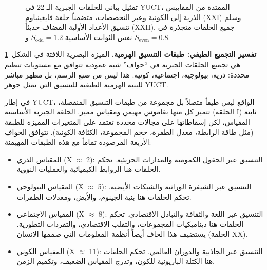 \documentclass[12pt,a4paper]{article}
\begin{document}
\begin{otherlanguage}{english}
\begin{figure}[htbp]
			\caption{تمثيل بياني للحلقات الجبرية الـ 22 في YUCT، الممتدة من المقاييس الذرية إلى الكونية وعبر التخصصات، متضمناً حلقة فايغينباوم (XXI) وسلم تنسيق الأعداد الأولية المضاف حديثاً (XXII). جميع الحلقات متجذرة في نفس الثوابت الأساسية $S_{\mathrm{odd}} = 1.2$ و $S_{\mathrm{even}} = 0.8$.}
			\label{fig:twentyone-loops}
		\end{figure}
	\end{otherlanguage}
	
	\vspace{0.5cm}
	\noindent
	\textbf{تفسير التجميع الطيفي: طبقات التنسيق الهرمية.}
	الميزة البصرية اللافتة في الشكل~\ref{fig:twentyone-loops} هي تجميع الحلقات الجبرية في ``حواف'' شبه عمودية تتوافق مع مستويات تنظيم محددة: ذرية، بيولوجية، اجتماعية، كونية. هذا ليس من صنع الرسم، بل مظهر مباشر للبنية الهرمية الطبقية للتنسيق التي تمثل جوهر YUCT.
	
	في إطار YUCT، الواقع ليس طيفاً متصلاً بل مجموعة من طبقات التنسيق المنفصلة، تتميز كل منها بقاموس مهيمن ومقياس مميز. الحلقة الجبرية الأساسية (الحلقة I) ثابتة المقياس، لكن إسقاطاتها على مجالات محددة تعتمد على المتغيرات المميزة للطبقة (مثل طاقة الرابطة، معدل الطفرة، حجم المجموعة، الكثافة الكونية). تتوافق الحواف الأربعة المرصودة تماماً مع هذه الطبقات المهيمنة:
	\begin{itemize}
		\item المقياس الذري (X $\approx$ 2): التنسيق عبر الحقول الكمومية والمدارات الجزيئية. تحكم الحلقات هنا الروابط الكيميائية والعمليات النووية.
		\item المقياس البيولوجي (X $\approx$ 5): التنسيق عبر الشيفرة الوراثية والشبكات الأيضية. تحكم الحلقات هنا بنية الجينوم، والأيض، ومعدلات الطفرات.
		\item المقياس الاجتماعي (X $\approx$ 8): التنسيق عبر اللغة والثقافة والتبادل الاقتصادي. تحكم الحلقات هنا ديناميكيات المجموعات، والتقلب الاقتصادي، والتفردات التطورية. يستضيف هذا الحاف أيضاً أنظمة المعلومات التي صممها الإنسان (الحلقة XX).
		\item المقياس الكوني (X $\approx$ 11): التنسيق عبر الجاذبية والدوران العالمي. تحكم الحلقات هنا الكتلة الباريونية للكون، وتدرج المقياس الضعيف، وتكميم الزمن.
	\end{itemize}
	
\end{document}
